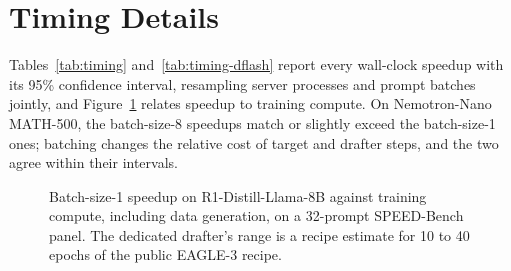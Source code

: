\documentclass[11pt]{article}
\begin{document}
\section{Timing Details}
\label{app:timing}

Tables~\ref{tab:timing} and~\ref{tab:timing-dflash} report every wall-clock speedup with its 95\% confidence interval, resampling server processes and prompt batches jointly, and Figure~\ref{fig:cost} relates speedup to training compute.
On Nemotron-Nano MATH-500, the batch-size-8 speedups match or slightly exceed the batch-size-1 ones; batching changes the relative cost of target and drafter steps, and the two agree within their intervals.

\begin{figure}[h]
  \centering
  
  \caption{Batch-size-1 speedup on R1-Distill-Llama-8B against training compute, including data generation, on a 32-prompt SPEED-Bench panel. The dedicated drafter's range is a recipe estimate for 10 to 40 epochs of the public EAGLE-3 recipe.}
  \label{fig:cost}
\end{figure}
\end{document}
